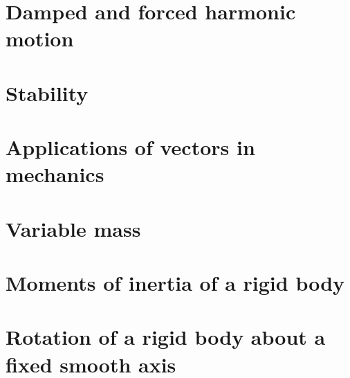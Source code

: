 \documentclass[a4paper]{article}
\begin{document}
\section{Damped and forced harmonic motion}

\section{Stability}

\section{Applications of vectors in mechanics}

\section{Variable mass}

\section{Moments of inertia of a rigid body}

\section{Rotation of a rigid body about a fixed smooth axis}




\printindex
\end{document}
